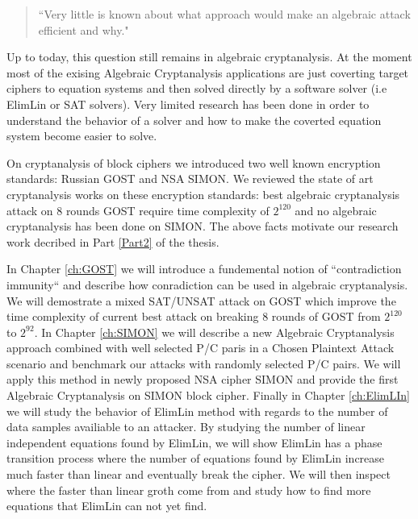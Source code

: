 \begin{quotation}
	``Very little is known about what approach would make an algebraic attack efficient and why." 
\end{quotation}


Up to today, this question still remains in algebraic cryptanalysis. At the moment most of the exising Algebraic Cryptanalysis applications are just coverting target ciphers to equation systems and then solved directly by a software solver  (i.e ElimLin or SAT solvers). Very limited research has been done in order to understand the behavior of a solver and how to make the coverted equation system become easier to solve. 

On cryptanalysis of block ciphers we introduced two well known encryption standards: Russian GOST and NSA SIMON. We reviewed the state of art cryptanalysis works on these encryption standards: best algebraic cryptanalysis attack on 8 rounds GOST require time complexity of $2^{120}$ and no algebraic cryptanalysis has been done on SIMON. The above facts motivate our research work decribed in Part \ref{Part2} of the thesis. 

In Chapter \ref{ch:GOST} we will introduce a fundemental notion of ``contradiction immunity`` and describe how conradiction can be used in algebraic cryptanalysis. We will demostrate a mixed SAT/UNSAT attack on GOST which improve the time complexity of current best attack on breaking 8 rounds of GOST from $2^{120}$ to $2^{92}$. In Chapter \ref{ch:SIMON} we will describe a new Algebraic Cryptanalysis approach combined with well selected P/C paris in a Chosen Plaintext Attack scenario and benchmark our attacks with randomly selected P/C pairs. We will apply this method in newly proposed NSA cipher SIMON and provide the first Algebraic Cryptanalysis on SIMON block cipher. Finally in Chapter \ref{ch:ElimLIn} we will study the behavior of ElimLin method with regards to the number of data samples availiable to an attacker. By studying the number of linear independent equations found by ElimLin, we will show ElimLin has a phase transition process where the number of equations found by ElimLin increase much faster than linear and eventually break the cipher. We will then inspect where the faster than linear groth come from and study how to find more equations that ElimLin can not yet find.

